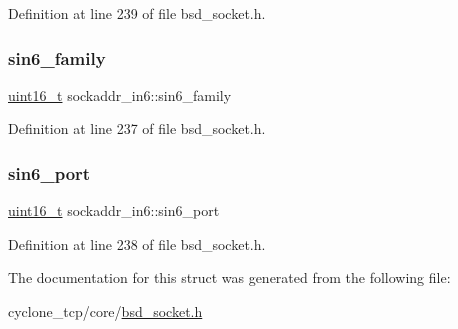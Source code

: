 Definition at line 239 of file bsd\+\_\+socket.\+h.

\mbox{\label{structsockaddr__in6_ac529d8e83c6d57c56d1cb7ddf61b0e8b}} 
\subsubsection{\texorpdfstring{sin6\+\_\+family}{sin6\_family}}
{\footnotesize\ttfamily \hyperlink{stdint_8h_a273cf69d639a59973b6019625df33e30}{uint16\+\_\+t} sockaddr\+\_\+in6\+::sin6\+\_\+family}



Definition at line 237 of file bsd\+\_\+socket.\+h.

\mbox{\label{structsockaddr__in6_a4fc2b7a478d258e9e778772701096022}} 
\subsubsection{\texorpdfstring{sin6\+\_\+port}{sin6\_port}}
{\footnotesize\ttfamily \hyperlink{stdint_8h_a273cf69d639a59973b6019625df33e30}{uint16\+\_\+t} sockaddr\+\_\+in6\+::sin6\+\_\+port}



Definition at line 238 of file bsd\+\_\+socket.\+h.



The documentation for this struct was generated from the following file\+:\begin{DoxyCompactItemize}
\item 
cyclone\+\_\+tcp/core/\hyperlink{bsd__socket_8h}{bsd\+\_\+socket.\+h}\end{DoxyCompactItemize}
